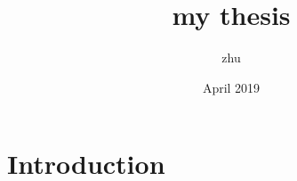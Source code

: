 \documentclass{article}
\title{my thesis}
\author{zhu}
\date{April 2019}
\begin{document}
\maketitle

\section{Introduction}
\end{document}
